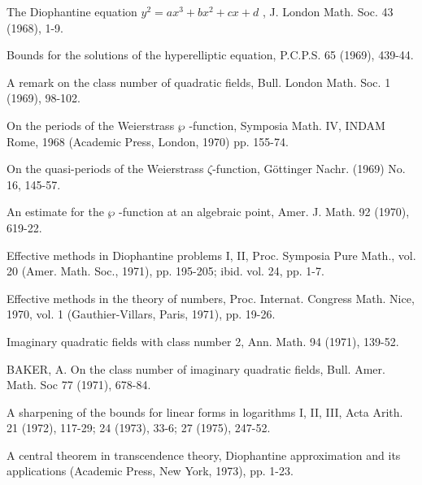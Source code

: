 \begin{hanglist}
    \item \hspace{1.5em} The Diophantine equation  $y^2 = ax^3 + bx^2 + cx + d$ , J. London Math. Soc. 43 (1968), 1-9.
    \item \hspace{1.5em} Bounds for the solutions of the hyperelliptic equation, P.C.P.S. 65 (1969), 439-44.
    \item \hspace{1.5em} A remark on the class number of quadratic fields, Bull. London Math. Soc. 1 (1969), 98-102.
    \item \hspace{1.5em} On the periods of the Weierstrass  $\wp$ -function, Symposia Math. IV, INDAM Rome, 1968 (Academic Press, London, 1970) pp. 155-74.
    \item \hspace{1.5em} On the quasi-periods of the Weierstrass \(\zeta\)-function, Göttinger Nachr. (1969) No. 16, 145-57.
    \item \hspace{1.5em} An estimate for the  $\wp$ -function at an algebraic point, Amer. J. Math. 92 (1970), 619-22.
    \item \hspace{1.5em} Effective methods in Diophantine problems I, II, Proc. Symposia Pure Math., vol. 20 (Amer. Math. Soc., 1971), pp. 195-205; ibid. vol. 24, pp. 1-7.
    \item \hspace{1.5em} Effective methods in the theory of numbers, Proc. Internat. Congress Math. Nice, 1970, vol. 1 (Gauthier-Villars, Paris, 1971), pp. 19-26.
    \item \hspace{1.5em} Imaginary quadratic fields with class number 2, Ann. Math. 94 (1971), 139-52.
    \item BAKER, A. On the class number of imaginary quadratic fields, Bull. Amer. Math. Soc 77 (1971), 678-84.
    \item \hspace{1.5em} A sharpening of the bounds for linear forms in logarithms I, II, III, Acta Arith. 21 (1972), 117-29; 24 (1973), 33-6; 27 (1975), 247-52.
    \item \hspace{1.5em} A central theorem in transcendence theory, Diophantine approximation and its applications (Academic Press, New York, 1973), pp. 1-23.

\end{hanglist}
